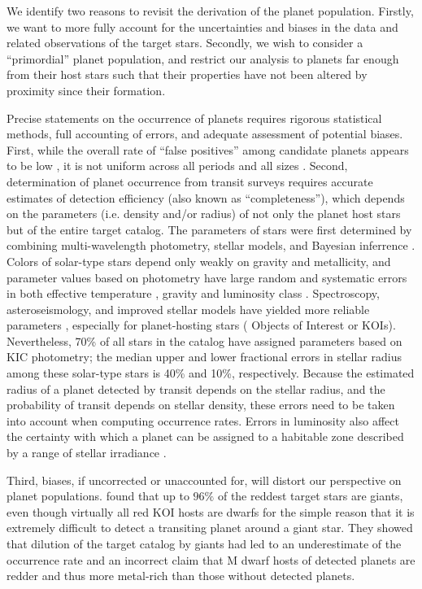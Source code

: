 We identify two reasons to revisit the derivation of the \kep{} planet
population. Firstly, we want to more fully account for the
uncertainties and biases in the \kep{} data and related observations
of the target stars.  Secondly, we wish to consider a ``primordial''
planet population, and restrict our analysis to planets far enough
from their host stars such that their properties have not been altered by
proximity since their formation.

Precise statements on the occurrence of planets requires rigorous
statistical methods, full accounting of errors, and adequate
assessment of potential biases.  First, while the overall rate of
``false positives'' among \kep{} candidate planets appears to be low
\citep{Morton2011,Fressin2013}, it is not uniform across all
  periods and all sizes \citep{Santerne2013}.  Second, determination
of planet occurrence from transit surveys requires accurate estimates
of detection efficiency (also known as ``completeness''), which depends on the
parameters (i.e. density and/or radius) of not only the planet host
stars but of the entire target catalog. The parameters of \kep{} stars
were first determined by combining multi-wavelength photometry,
stellar models, and Bayesian inferrence \citep{Brown2011}.  Colors of
solar-type stars depend only weakly on gravity and metallicity, and
parameter values based on photometry have large random and systematic
errors in both effective temperature \citep{Pinsonneault2012}, gravity
and luminosity class \citep{Mann2012}.  Spectroscopy, asteroseismology,
and improved stellar models have yielded more reliable parameters 
\citep{Huber2014}, especially for \kep{} planet-hosting stars 
(\kep{} Objects of Interest or KOIs).  Nevertheless, 70\% of all stars in the
\citet{Huber2014} catalog have assigned parameters based on KIC
photometry; the median upper and lower fractional errors in stellar
radius among these solar-type stars is 40\% and 10\%, respectively. Because
the estimated radius of a planet detected by transit depends on the
stellar radius, and the probability of transit depends on stellar
density, these errors need to be taken into account when computing
occurrence rates.  Errors in luminosity also affect the certainty with
which a planet can be assigned to a habitable zone described by a
range of stellar irradiance \citep{Gaidos2013,Mann2013}.

Third, biases, if uncorrected or unaccounted for, will distort our 
perspective on planet populations.  
\citet{Mann2012} found that up to $96\%$ of
the reddest \kep{} target stars are giants, even though virtually all
red KOI hosts are dwarfs for the simple reason that it is extremely
difficult to detect a transiting planet around a giant star.  They
showed that dilution of the target catalog by giants had led to an
underestimate of the occurrence rate and an incorrect claim that M
dwarf hosts of detected planets are redder and thus more metal-rich
than those without detected planets.

